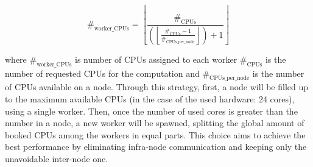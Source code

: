 $$
\#_{\text{worker\_CPUs}} = \left\lfloor \frac{\#_{\text{CPUs}}}{\left( \left\lfloor
    \frac{\#_{\text{CPUs}} - 1}{\#_{\text{CPUs\_per\_node}}} \right\rfloor \right) + 1} \right\rfloor
$$

\noindent where $\#_{\text{worker\_CPUs}}$ is number of CPUs assigned to each worker
$\#_{\text{CPUs}}$ is the number of requested CPUs for the computation and
$\#_{\text{CPUs\_per\_node}}$ is the number of CPUs available on a node. Through
this strategy, first, a node will be filled up to the maximum available CPUs (in
the case of the used hardware: 24 cores), using a single worker. Then, once the
number of used cores is greater than the number in a node, a new worker will be
spawned, splitting the global amount of booked CPUs among the workers in equal
parts. This choice aims to achieve the best performance by eliminating
infra-node communication and keeping only the unavoidable inter-node one.




